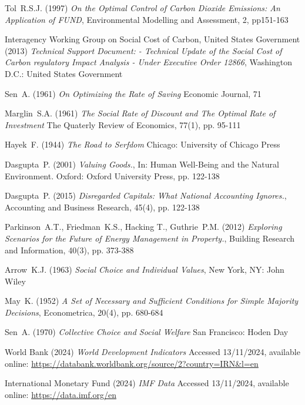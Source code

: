 \documentclass[11pt, oneside]{article}   	%
\begin{document}
\begin{thebibliography}{99}
 Tol~R.S.J. (1997)
\emph{On the Optimal Control of Carbon Dioxide Emissions: An Application of FUND},
Environmental Modelling and Assessment, 2, pp151-163
		
 Interagency Working Group on Social Cost of Carbon, United States Government (2013)
\emph{Technical Support Document: - Technical Update of the Social Cost of Carbon regulatory Impact Analysis - Under Executive Order 12866},
Washington D.C.: United States Government
		
 Sen~A. (1961)
\emph{On Optimizing the Rate of Saving}
Economic Journal, 71
		
 Marglin~S.A. (1961)
\emph{The Social Rate of Discount and The Optimal Rate of Investment}
The Quaterly Review of Economics, 77(1), pp. 95-111
		
 Hayek~F. (1944)
\emph{The Road to Serfdom}
Chicago: University of Chicago Press
		
 Dasgupta~P. (2001)
\emph{Valuing Goods.},
In: Human Well-Being and the Natural Environment. Oxford: Oxford University Press, pp. 122-138
		
 Dasgupta~P. (2015)
\emph{Disregarded Capitals: What National Accounting Ignores.},
Accounting and Business Research, 45(4), pp. 122-138

 Parkinson~A.T., Friedman~K.S., Hacking T., Guthrie~P.M. (2012)
\emph{Exploring Scenarios for the Future of Energy Management in Property.},
Building Research and Information, 40(3), pp. 373-388

 Arrow~K.J. (1963)
\emph{Social Choice and Individual Values},
New York, NY: John Wiley
	
 May~K. (1952)
\emph{A Set of Necessary and Sufficient Conditions for Simple Majority Decisions},
Econometrica, 20(4), pp. 680-684

 Sen~A. (1970)
\emph{Collective Choice and Social Welfare}
San Francisco: Hoden Day

 World Bank (2024)
\emph{World Development Indicators}
Accessed 13/11/2024, available online: 
\url{https://databank.worldbank.org/source/2?country=IRN&l=en}

 International Monetary Fund (2024)
\emph{IMF Data}
Accessed 13/11/2024, available online: 
\url{https://data.imf.org/en}
	
\end{thebibliography}
\end{document}
